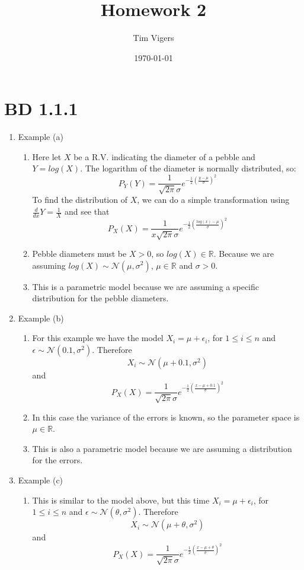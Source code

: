 \documentclass[a4paper,12pt]{article}
\begin{document}
\title{Homework 2}
\author{Tim Vigers}
\date{\today}
\maketitle

\section{BD 1.1.1}
\begin{enumerate}
  \item Example (a)
  \begin{enumerate}
     \item Here let $X$ be a R.V. indicating the diameter of a pebble and $Y=log(X)$. The logarithm of the diameter is normally distributed, so: $$P_Y(Y)=\frac{1}{\sqrt{2\pi}\sigma}e^{-\frac{1}{2}(\frac{y-\mu}{\sigma})^2}$$
     To find the distribution of $X$, we can do a simple transformation using $\frac{d}{dx}Y=\frac{1}{X}$ and see that $$P_X(X)=\frac{1}{x\sqrt{2\pi}\sigma}e^{-\frac{1}{2}(\frac{log(x)-\mu}{\sigma})^2}$$
     \item Pebble diameters must be $X>0$, so $log(X)\in\mathbb{R}$. Because we are assuming $log(X)\sim \mathcal{N}(\mu,\sigma^2)$, $\mu\in\mathbb{R}$ and $\sigma>0$.
     \item This is a parametric model because we are assuming a specific distribution for the pebble diameters.
   \end{enumerate}
  \item Example (b)
  \begin{enumerate}
     \item For this example we have the model $X_i=\mu+\epsilon_i$, for $1\leq i \leq n$ and $\epsilon\sim \mathcal{N}(0.1,\sigma^2)$. Therefore $$X_i\sim\mathcal{N}(\mu+0.1,\sigma^2)$$ and $$P_X(X)=\frac{1}{\sqrt{2\pi}\sigma}e^{-\frac{1}{2}(\frac{x-\mu+0.1}{\sigma})^2}$$
     \item In this case the variance of the errors is known, so the parameter space is $\mu\in\mathbb{R}$.
     \item This is also a parametric model because we are assuming a distribution for the errors.
   \end{enumerate}
   \item Example (c)
   \begin{enumerate}
      \item This is similar to the model above, but this time $X_i=\mu+\epsilon_i$, for $1\leq i \leq n$ and $\epsilon\sim \mathcal{N}(\theta,\sigma^2)$. Therefore $$X_i\sim\mathcal{N}(\mu+\theta,\sigma^2)$$ and  $$P_X(X)=\frac{1}{\sqrt{2\pi}\sigma}e^{-\frac{1}{2}(\frac{x-\mu+\theta}{\sigma})^2}$$

\end{enumerate}
\end{enumerate}
\end{document}
